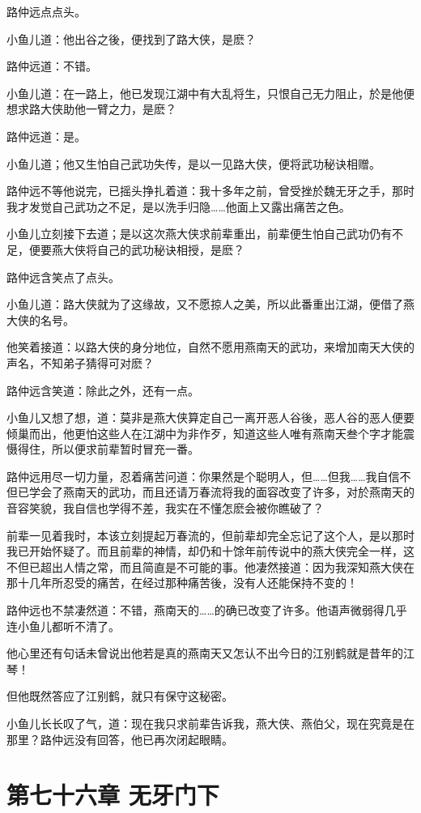 \documentclass[12pt,oneside]{book}
\begin{document}
路仲远点点头。

小鱼儿道：他出谷之後，便找到了路大侠，是麽？

路仲远道：不错。

小鱼儿道：在一路上，他已发现江湖中有大乱将生，只恨自己无力阻止，於是他便想求路大侠助他一臂之力，是麽？

路仲远道：是。

小鱼儿道；他又生怕自己武功失传，是以一见路大侠，便将武功秘诀相赠。

路仲远不等他说完，已摇头挣扎着道：我十多年之前，曾受挫於魏无牙之手，那时我才发觉自己武功之不足，是以洗手归隐\ldots\ldots 他面上又露出痛苦之色。

小鱼儿立刻接下去道；是以这次燕大侠求前辈重出，前辈便生怕自己武功仍有不足，便要燕大侠将自己的武功秘诀相授，是麽？

路仲远含笑点了点头。

小鱼儿道：路大侠就为了这缘故，又不愿掠人之美，所以此番重出江湖，便借了燕大侠的名号。

他笑着接道：以路大侠的身分地位，自然不愿用燕南天的武功，来增加南天大侠的声名，不知弟子猜得可对麽？

路仲远含笑道：除此之外，还有一点。

小鱼儿又想了想，道：莫非是燕大侠算定自己一离开恶人谷後，恶人谷的恶人便要倾巢而出，他更怕这些人在江湖中为非作歹，知道这些人唯有燕南天叁个字才能震慑得住，所以便求前辈暂时冒充一番。

路仲远用尽一切力量，忍着痛苦问道：你果然是个聪明人，但\ldots\ldots 但我\ldots\ldots 我自信不但已学会了燕南天的武功，而且还请万春流将我的面容改变了许多，对於燕南天的音容笑貌，我自信也学得不差，我实在不懂怎麽会被你瞧破了？

前辈一见着我时，本该立刻提起万春流的，但前辈却完全忘记了这个人，是以那时我已开始怀疑了。而且前辈的神情，却仍和十馀年前传说中的燕大侠完全一样，这不但已超出人情之常，而且简直是不可能的事。他凄然接道：因为我深知燕大侠在那十几年所忍受的痛苦，在经过那种痛苦後，没有人还能保持不变的！

路仲远也不禁凄然道：不错，燕南天的\ldots\ldots 的确已改变了许多。他语声微弱得几乎连小鱼儿都听不清了。

他心里还有句话未曾说出他若是真的燕南天又怎认不出今日的江别鹤就是昔年的江琴！

但他既然答应了江别鹤，就只有保守这秘密。

小鱼儿长长叹了气，道：现在我只求前辈告诉我，燕大侠、燕伯父，现在究竟是在那里？路仲远没有回答，他已再次闭起眼睛。

\hypertarget{ux7b2cux4e03ux5341ux516dux7ae0-ux65e0ux7259ux95e8ux4e0b}{%
\chapter{第七十六章
无牙门下}\label{ux7b2cux4e03ux5341ux516dux7ae0-ux65e0ux7259ux95e8ux4e0b}}
\end{document}
